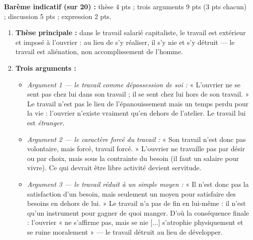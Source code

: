 \documentclass[11pt]{article}
\begin{document}
\begin{corrige}
\textbf{Barème indicatif (sur 20) :} thèse 4 pts ; trois arguments 9 pts (3 pts chacun) ; discussion 5 pts ; expression 2 pts.

\begin{enumerate}
    \item \textbf{Thèse principale :} dans le travail salarié capitaliste, le travail est extérieur et imposé à l'ouvrier : au lieu de s'y réaliser, il s'y nie et s'y détruit — le travail est aliénation, non accomplissement de l'homme.

    \item \textbf{Trois arguments :}
    \begin{itemize}
        \item \emph{Argument 1 — le travail comme dépossession de soi :} « L'ouvrier ne se sent pas chez lui dans son travail ; il se sent chez lui hors de son travail. » Le travail n'est pas le lieu de l'épanouissement mais un temps perdu pour la vie : l'ouvrier n'existe vraiment qu'en dehors de l'atelier. Le travail lui est \emph{étranger}.
        \item \emph{Argument 2 — le caractère forcé du travail :} « Son travail n'est donc pas volontaire, mais forcé, travail forcé. » L'ouvrier ne travaille pas par désir ou par choix, mais sous la contrainte du besoin (il faut un salaire pour vivre). Ce qui devrait être libre activité devient servitude.
        \item \emph{Argument 3 — le travail réduit à un simple moyen :} « Il n'est donc pas la satisfaction d'un besoin, mais seulement un moyen pour satisfaire des besoins en dehors de lui. » Le travail n'a pas de fin en lui-même : il n'est qu'un instrument pour gagner de quoi manger. D'où la conséquence finale : l'ouvrier « ne s'affirme pas, mais se nie [...] s'atrophie physiquement et se ruine moralement » — le travail détruit au lieu de développer.
    \end{itemize}


\end{enumerate}
\end{corrige}
\end{document}
